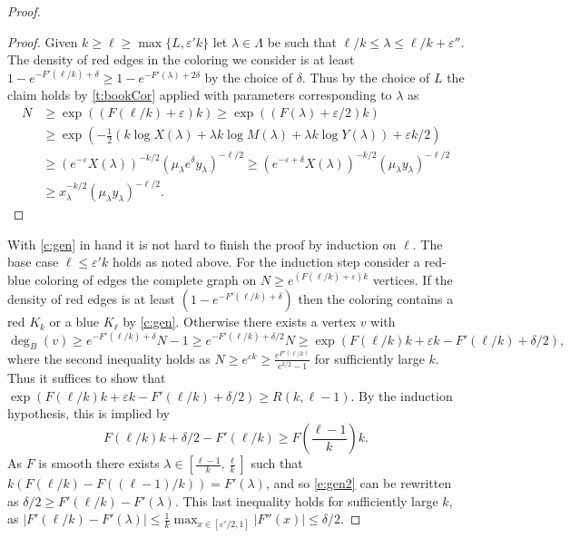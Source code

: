 \documentclass[reqno,final,12pt]{amsart}
\newcommand{\eps}{\varepsilon}
\newcommand{\s}[1]{\left(#1\right)}
\begin{document}
\begin{proof}
\begin{proof}
	Given  $k \geq \ell \geq \max\{ L, \eps' k \}$ let $\lambda \in \Lambda$ be such that $\ell/k \leq \lambda \leq \ell/k + \eps''$. The density of red edges in the coloring we consider is at least $ 1 - e^{-F'(\ell/k)+\delta} \geq 1 - e^{-F'(\lambda)+2\delta}$ by the choice of $\delta$. Thus by the choice of $L$  the claim holds by \cref{t:bookCor}  applied with parameters corresponding to $\lambda$ as \begin{align*} N &\geq \exp\s{(F(\ell/k)+\eps)k} \geq \exp\s{(F(\lambda)+\eps/2)k} \\ &\geq    \exp\s{-\frac{1}{2} \s{k\log X(\lambda)+ \lambda k \log M(\lambda) + \lambda k \log Y(\lambda)}+\eps k/2} \\& \geq (e^{-\eps}X(\lambda))^{-k/2}(\mu_{\lambda} e^{\delta} y_{\lambda})^{-\ell/2} \geq (e^{-\eps +\delta}X(\lambda))^{-k/2}(\mu_{\lambda} y_{\lambda})^{-\ell/2} \\ &\geq x_{\lambda}^{-k/2}(\mu_{\lambda}  y_{\lambda})^{-\ell/2}.\end{align*} 	
\end{proof}


With \cref{c:gen} in hand it is not hard to finish the proof by induction on $\ell$. The base case $\ell \leq \eps'k$ holds as noted above.
For the induction step consider a red-blue coloring of edges the complete graph on $N \geq e^{(F(\ell/k)+\eps)k}$ vertices. If the density of red edges is at least $(1 - e^{-F'(\ell/k)+\delta})$ then the coloring contains a red $K_k$ or a blue $K_{\ell}$ by \cref{c:gen}. Otherwise there exists a vertex $v$ with $$\deg_B(v) \geq e^{-F'(\ell/k)+\delta}N -1 \geq e^{-F'(\ell/k)+\delta/2}N  \geq \exp\s{F(\ell/k)k+\eps k-F'(\ell/k)+\delta/2},$$ 
where the second inequality holds  as $N \geq e^{\eps  k} \geq \frac{e^{F'(\ell/k)}}{e^{\delta/2}-1}$ for sufficiently large $k$.
Thus it suffices to show that $\exp\s{F(\ell/k)k+\eps k-F'(\ell/k)+\delta/2} \geq R(k,\ell-1)$. By the induction hypothesis, this is implied by \begin{equation}\label{e:gen2}F(\ell/k)k+\delta/2-F'(\ell/k) \geq F\s{\frac{\ell-1}{k}}k.\end{equation} As $F$ is smooth there exists $\lambda \in \left[\frac{\ell-1}{k},\frac{\ell}{k}\right]$ such that
$k(F(\ell/k)-F((\ell-1)/k)) = F'(\lambda)$, and so \eqref{e:gen2} can be rewritten as $\delta/2 \geq F'(\ell/k) -F'(\lambda).$ This last inequality holds for sufficiently large $k$, as $|F'(\ell/k) -F'(\lambda)| \leq \frac{1}{k}\max_{x \in [\eps'/2,1]}|F''(x)| \leq \delta/2.$
\end{proof}
\end{document}
